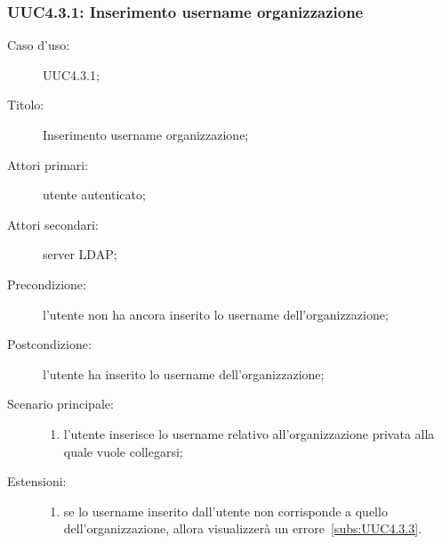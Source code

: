 \documentclass[../../../analisi-dei-requisiti.tex]{subfiles}
\begin{document}
\subsubsection{UUC4.3.1: Inserimento username organizzazione}%
\label{subs:UUC4.3.1}
\begin{description}
  \item[Caso d’uso:] UUC4.3.1;
  \item[Titolo:] Inserimento username organizzazione;
  \item[Attori primari:] utente autenticato;
  \item[Attori secondari:] server LDAP\@;
  \item[Precondizione:] l'utente non ha ancora inserito lo username dell'organizzazione;
  \item[Postcondizione:] l'utente ha inserito lo username dell'organizzazione;
  \item[Scenario principale:]
        \begin{enumerate}
          \item l'utente inserisce lo username relativo all'organizzazione privata alla quale vuole collegarsi;
        \end{enumerate}
  \item[Estensioni:]
        \begin{enumerate}
          \item se lo username inserito dall'utente non corrisponde a quello dell'organizzazione, allora visualizzerà un errore~\ref{subs:UUC4.3.3}.
        \end{enumerate}
\end{description}
\end{document}
